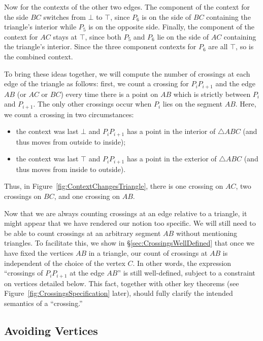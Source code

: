 Now for the contexts of the other two edges. The component of the context for the side $BC$ switches from $\bot$ to $\top$, since $P_6$ is on the side of $BC$ containing the triangle's interior while $P_5$ is on the opposite side. Finally, the component of the context for $AC$ stays at $\top$, since both $P_5$ and $P_6$ lie on the side of $AC$ containing the triangle's interior. Since the three component contexts for $P_6$ are all $\top$, so is the combined context.

To bring these ideas together, we will compute the number of crossings at each edge of the triangle as follows: first, we count a crossing for $P_iP_{i+1}$ and the edge $AB$ (or $AC$ or $BC$) every time there is a point on $AB$ which is strictly between $P_i$ and $P_{i+1}$. The only other crossings occur when $P_i$ lies on the segment $AB$. Here, we count a crossing in two circumstances:
\begin{itemize}
\item the context was last $\bot$ and $P_iP_{i+1}$ has a point in the interior of $\triangle ABC$ (and thus moves from outside to inside);
\item the context was last $\top$ and $P_iP_{i+1}$ has a point in the exterior of $\triangle ABC$ (and thus moves from inside to outside).
\end{itemize}

Thus, in Figure~\ref{fig:ContextChangesTriangle}, there is one crossing on $AC$, two crossings on $BC$, and one crossing on $AB.$

Now that we are always counting crossings at an edge relative to a triangle, it might appear that we have rendered our notion too specific. We will still need to be able to count crossings at an arbitrary segment $AB$ without mentioning triangles. To facilitate this, we show in \S\ref{sec:CrossingsWellDefined} that once we have fixed the vertices $AB$ in a triangle, our count of crossings at $AB$ is independent of the choice of the vertex $C$. In other words, the expression ``crossings of $P_iP_{i+1}$ at the edge $AB$'' is still well-defined, subject to a constraint on vertices detailed below. This fact, together with other key theorems (see Figure~\ref{fig:CrossingsSpecification} later), should fully clarify the intended semantics of a ``crossing.''

\subsection{Avoiding Vertices}\label{sec:EdgeCases}

